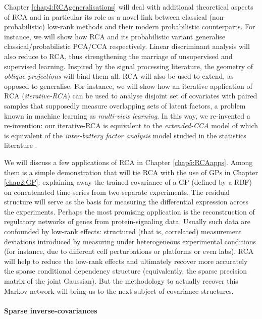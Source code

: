   Chapter \ref{chap4:RCAgeneralisations} will deal with additional theoretical aspects of RCA and in particular its role as a novel link between classical (non-probabilistic) low-rank methods and their modern probabilistic counterparts.
  For instance, we will show how RCA and its probabilistic variant generalise classical/probabilistic PCA/CCA respectively.
  Linear discriminant analysis will also reduce to RCA, thus strengthening the marriage of unsupervised and supervised learning.
  Inspired by the signal processing literature, the geometry of \emph{oblique projections} will bind them all.
  RCA will also be used to extend, as opposed to generalise.
  For instance, we will show how an iterative application of RCA (\emph{iterative-RCA}) can be used to analyse disjoint set of covariates with paired samples that supposedly measure overlapping sets of latent factors, a problem known in machine learning as \emph{multi-view learning}.
  {\color{black} In this way,} we re-invented a re-invention: our iterative-RCA is equivalent to the \emph{extended-CCA} model of \citet{Klami:generative06} which is equivalent of the \emph{inter-battery factor analysis} model studied in the statistics literature \citep{Tucker:interbattery58}.
  
  We will discuss a few applications of RCA in Chapter \ref{chap5:RCAapps}.
  Among them is a simple demonstration that will tie RCA with the use of GPs in Chapter \ref{chap2:GP}: explaining away the trained covariance of a GP (defined by a RBF) on concatenated time-series from two separate experiments.
  The residual structure will serve as the basis for measuring the differential expression across the experiments.
  Perhaps the most promising application is the reconstruction of regulatory networks of genes from protein-signaling data.
  Usually such data are confounded by low-rank effects: structured (that is, correlated) measurement deviations introduced by measuring under heterogeneous experimental conditions (for instance, due to different cell perturbations or platforms or even labs).
  RCA will help to reduce the low-rank effects and ultimately recover more accurately the sparse conditional dependency structure (equivalently, the sparse precision matrix of the joint Gaussian). But the methodology to actually recover this Markov network will bring us to the next subject of covariance structures.
   
  \paragraph{Sparse inverse-covariances}
  
